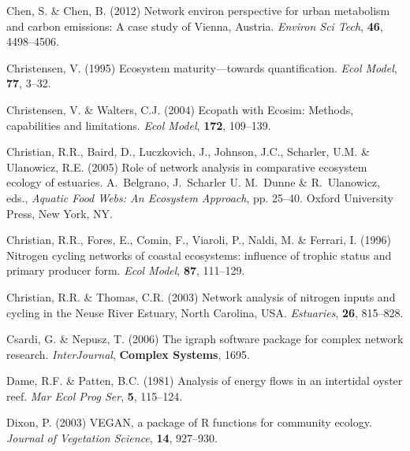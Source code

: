 \documentclass[11pt]{article}
\begin{document}
\begin{thebibliography}{75}
Chen, S. \& Chen, B. (2012) Network environ perspective for urban metabolism
  and carbon emissions: A case study of {Vienna, A}ustria.
\newblock \emph{Environ Sci Tech}, \textbf{46}, 4498--4506.

Christensen, V. (1995) Ecosystem maturity---towards quantification.
\newblock \emph{Ecol Model}, \textbf{77}, 3--32.

Christensen, V. \& Walters, C.J. (2004) Ecopath with {E}cosim: {M}ethods,
  capabilities and limitations.
\newblock \emph{Ecol Model}, \textbf{172}, 109--139.

Christian, R.R., Baird, D., Luczkovich, J., Johnson, J.C., Scharler, U.M. \&
  Ulanowicz, R.E. (2005) Role of network analysis in comparative ecosystem
  ecology of estuaries.
\newblock A.~Belgrano, J.~Scharler U. M.~Dunne \& R.~Ulanowicz, eds.,
  \emph{Aquatic Food Webs: An Ecosystem Approach}, pp. 25--40. Oxford
  University Press, New York, NY.

Christian, R.R., Fores, E., Comin, F., Viaroli, P., Naldi, M. \& Ferrari, I.
  (1996) Nitrogen cycling networks of coastal ecosystems: influence of trophic
  status and primary producer form.
\newblock \emph{Ecol Model}, \textbf{87}, 111--129.

Christian, R.R. \& Thomas, C.R. (2003) Network analysis of nitrogen inputs and
  cycling in the {Neuse River Estuary, North Carolina, USA}.
\newblock \emph{Estuaries}, \textbf{26}, 815--828.

Csardi, G. \& Nepusz, T. (2006) The igraph software package for complex network
  research.
\newblock \emph{InterJournal}, \textbf{Complex Systems}, 1695.

Dame, R.F. \& Patten, B.C. (1981) Analysis of energy flows in an intertidal
  oyster reef.
\newblock \emph{Mar Ecol Prog Ser}, \textbf{5}, 115--124.

Dixon, P. (2003) {VEGAN}, a package of {R} functions for community ecology.
\newblock \emph{Journal of Vegetation Science}, \textbf{14}, 927--930.


\end{thebibliography}
\end{document}
